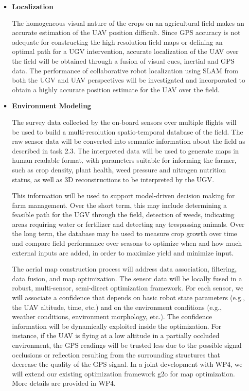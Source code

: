 \begin{itemize}

\item  {\bf Localization}
	
 The homogeneous visual nature of the crops on an agricultural field makes an accurate estimation of the UAV position difficult. Since GPS accuracy is not adequate for constructing the high resolution field maps or defining an optimal path for a UGV intervention, accurate localization of the UAV over the field will be obtained through a fusion of visual cues, inertial and GPS data. The performance of collaborative robot localization using SLAM from both the UGV and UAV perspectives will be investigated and incorporated to obtain a highly accurate position estimate for the UAV over the field.
	
\item {\bf Environment Modeling}

  The survey data collected by the on-board sensors over multiple
  flights will be used to build a multi-resolution spatio-temporal
  database of the field. The raw sensor data will be converted into
  semantic information about the field as described in task 2.3. The
  interpreted data will be used to generate maps in human readable
  format, with parameters suitable for informing the farmer, such as
  crop density, plant health, weed pressure and nitrogen nutrition
  status, as well as 3D reconstructions to be interpreted by the UGV.

  This information will be used to support model-driven decision
  making for farm management. Over the short term, this may include
  determining a feasible path for the UGV through the field, detection
  of weeds, indicating areas requiring water or fertilizer and
  detecting any trespassing animals. Over the long term, the database
  may be used to measure crop growth over time and compare field
  performance over seasons to optimize when and how much external
  inputs are added, in order to maximize yield and minimize input.

  The aerial map construction process will address data association,
  filtering, data fusion, and map optimization.  The sensor data will
  be locally fused in a robust, multi-sensor, semi-direct optimization
  framework.  For each sensor, we will associate a confidence that
  depends on basic robot state parameters (e.g., the UAV altitude,
  time, etc.) and on the environment conditions (e.g., weather
  conditions, environment morphology, etc.).  The confidence
  information will be dynamically exploited inside the
  optimization. For instance, if the UAV is flying at a low altitude
  in a partially occluded environment, the GPS readings will be
  trusted less due to the possible signal occlusions or reflection
  resulting from the surrounding structures that decrease the quality
  of the GPS signal.  In a joint development with WP4, we will extend
  our existing optimization framework g2o for map optimization. More
  details are provided in WP4.




\end{itemize}
